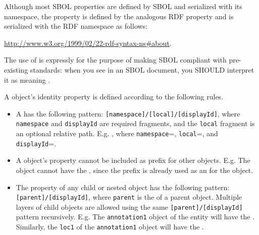 Although most SBOL properties are defined by SBOL and serialized with its namespace, the  property is defined by the analogous RDF  property and is serialized with the RDF namespace as follows:

\url{http://www.w3.org/1999/02/22-rdf-syntax-ns\#about}.

The use of  is expressly for the purpose of making SBOL compliant with pre-existing standards: when you see  in an SBOL document, you SHOULD interpret it as meaning .

A  object's identity property is defined according to the following rules.

\begin{itemize}
 
 \item A   has the following pattern:
  \texttt{[namespace]/[local]/[displayId]},  where \texttt{namespace} and \texttt{displayId} are required fragments, and the \texttt{local} fragment is an optional relative path. E.g. , where \texttt{namespace}=, \texttt{local}=, and \texttt{displayId}=.
 
  \item A  object's  property cannot be included as prefix for other  objects. E.g. The   object cannot have the  , since the  prefix is already used as an  for the   object.
  \item The  property of any child or nested object has the following pattern:\texttt{[parent]/[displayId]}, where \texttt{parent} is the  of a parent object. Multiple layers of child objects are allowed using the same \texttt{[parent]/[displayId]} pattern recursively. E.g. The \texttt{annotation1}  object of the   entity will have the  . Similarly, the \texttt{loc1}  of the \texttt{annotation1}  object will have the  .
  \end{itemize}
  
